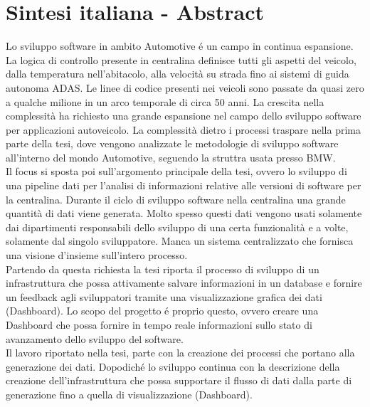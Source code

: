 \documentclass[../main.tex]{subfiles}
\begin{document}
\section{Sintesi italiana - Abstract}
Lo sviluppo software in ambito Automotive é un campo in continua espansione. La logica di controllo presente in centralina definisce tutti gli aspetti del veicolo, dalla temperatura nell'abitacolo, alla velocità su strada fino ai sistemi di guida autonoma \gls{ADAS}. 
Le linee di codice presenti nei veicoli sono passate da quasi zero a qualche milione in un arco temporale di circa 50 anni. La crescita nella complessità ha richiesto una grande espansione nel campo dello sviluppo software per applicazioni autoveicolo. La complessità dietro i processi traspare nella prima parte della tesi, dove vengono analizzate le metodologie di sviluppo software all'interno del mondo Automotive, seguendo la struttra usata presso \gls{BMW}.\\
Il focus si sposta poi sull'argomento principale della tesi, ovvero lo sviluppo di una pipeline dati per l'analisi di informazioni relative alle versioni di software per la centralina. Durante il ciclo di sviluppo software nella centralina una grande quantità di dati viene generata. Molto spesso questi dati vengono usati solamente dai dipartimenti responsabili dello sviluppo di una certa funzionalità e a volte, solamente dal singolo sviluppatore. Manca un sistema centralizzato che fornisca una visione d'insieme sull'intero processo.\\
Partendo da questa richiesta la tesi riporta il processo di sviluppo di un infrastruttura che possa attivamente salvare informazioni in un database e fornire un feedback agli sviluppatori tramite una visualizzazione grafica dei dati (Dashboard). Lo scopo del progetto é proprio questo, ovvero creare una Dashboard che possa fornire in tempo reale informazioni sullo stato di avanzamento dello sviluppo del software.\\
Il lavoro riportato nella tesi, parte con la creazione dei processi che portano alla generazione dei dati. Dopodiché lo sviluppo continua con la descrizione della creazione dell'infrastruttura che possa supportare il flusso di dati dalla parte di generazione fino a quella di visualizzazione (Dashboard). 
\end{document}
